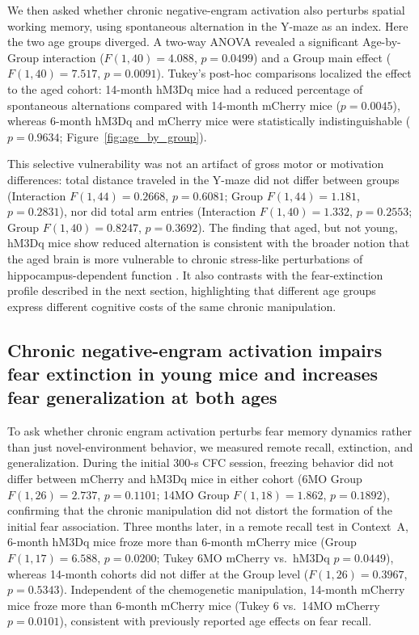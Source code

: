 \documentclass[11pt]{article}
\begin{document}
We then asked whether chronic negative-engram activation also perturbs spatial working memory, using spontaneous alternation in the Y-maze as an index. Here the two age groups diverged. A two-way ANOVA revealed a significant Age-by-Group interaction ($F(1,40)=4.088$, $p=0.0499$) and a Group main effect ($F(1,40)=7.517$, $p=0.0091$). Tukey's post-hoc comparisons localized the effect to the aged cohort: 14-month hM3Dq mice had a reduced percentage of spontaneous alternations compared with 14-month mCherry mice ($p=0.0045$), whereas 6-month hM3Dq and mCherry mice were statistically indistinguishable ($p=0.9634$; Figure~\ref{fig:age_by_group}).

This selective vulnerability was not an artifact of gross motor or motivation differences: total distance traveled in the Y-maze did not differ between groups (Interaction $F(1,44)=0.2668$, $p=0.6081$; Group $F(1,44)=1.181$, $p=0.2831$), nor did total arm entries (Interaction $F(1,40)=1.332$, $p=0.2553$; Group $F(1,40)=0.8247$, $p=0.3692$). The finding that aged, but not young, hM3Dq mice show reduced alternation is consistent with the broader notion that the aged brain is more vulnerable to chronic stress-like perturbations of hippocampus-dependent function \citep{sapolsky1986glucocorticoid,klempin2007neurogenesis}. It also contrasts with the fear-extinction profile described in the next section, highlighting that different age groups express different cognitive costs of the same chronic manipulation.

\subsection{Chronic negative-engram activation impairs fear extinction in young mice and increases fear generalization at both ages}

To ask whether chronic engram activation perturbs fear memory dynamics rather than just novel-environment behavior, we measured remote recall, extinction, and generalization. During the initial 300-s CFC session, freezing behavior did not differ between mCherry and hM3Dq mice in either cohort (6MO Group $F(1,26)=2.737$, $p=0.1101$; 14MO Group $F(1,18)=1.862$, $p=0.1892$), confirming that the chronic manipulation did not distort the formation of the initial fear association. Three months later, in a remote recall test in Context~A, 6-month hM3Dq mice froze more than 6-month mCherry mice (Group $F(1,17)=6.588$, $p=0.0200$; Tukey 6MO mCherry vs.~hM3Dq $p=0.0449$), whereas 14-month cohorts did not differ at the Group level ($F(1,26)=0.3967$, $p=0.5343$). Independent of the chemogenetic manipulation, 14-month mCherry mice froze more than 6-month mCherry mice (Tukey 6 vs.~14MO mCherry $p=0.0101$), consistent with previously reported age effects on fear recall.
\end{document}
